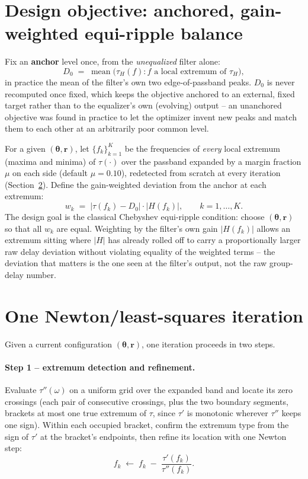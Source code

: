 \documentclass[11pt]{article}
\begin{document}
\section{Design objective: anchored, gain-weighted equi-ripple balance}

Fix an \textbf{anchor} level once, from the \emph{unequalized} filter
alone:
\begin{equation}
D_0 \;=\; \operatorname{mean}\Big(\tau_H(f) : f \text{ a local extremum of } \tau_H\Big),
\label{eq:anchor}
\end{equation}
in practice the mean of the filter's own two edge-of-passband peaks.
$D_0$ is never recomputed once fixed, which keeps the objective anchored
to an external, fixed target rather than to the equalizer's own
(evolving) output -- an unanchored objective was found in practice to
let the optimizer invent new peaks and match them to each other at an
arbitrarily poor common level.

For a given $(\boldsymbol\theta, \mathbf r)$, let $\{f_k\}_{k=1}^K$ be
the frequencies of \emph{every} local extremum (maxima and minima) of
$\tau(\cdot)$ over the passband expanded by a margin fraction $\mu$ on
each side (default $\mu=0.10$), redetected from scratch at every
iteration (Section~\ref{sec:iteration}). Define the gain-weighted
deviation from the anchor at each extremum:
\begin{equation}
w_k \;=\; \big|\tau(f_k) - D_0\big| \cdot |H(f_k)|, \qquad k = 1, \dots, K.
\label{eq:wk}
\end{equation}
The design goal is the classical Chebyshev equi-ripple condition: choose
$(\boldsymbol\theta, \mathbf r)$ so that all $w_k$ are equal. Weighting
by the filter's own gain $|H(f_k)|$ allows an extremum sitting where
$|H|$ has already rolled off to carry a proportionally larger raw delay
deviation without violating equality of the weighted terms -- the
deviation that matters is the one seen at the filter's output, not the
raw group-delay number.

\section{One Newton/least-squares iteration}
\label{sec:iteration}

Given a current configuration $(\boldsymbol\theta, \mathbf r)$, one
iteration proceeds in two steps.

\paragraph{Step 1 -- extremum detection and refinement.} Evaluate
$\tau''(\omega)$ on a uniform grid over the expanded band and locate its
zero crossings (each pair of consecutive crossings, plus the two
boundary segments, brackets at most one true extremum of $\tau$, since
$\tau'$ is monotonic wherever $\tau''$ keeps one sign). Within each
occupied bracket, confirm the extremum type from the sign of $\tau'$ at
the bracket's endpoints, then refine its location with one Newton step:
\begin{equation}
f_k \;\leftarrow\; f_k \;-\; \frac{\tau'(f_k)}{\tau''(f_k)}.
\label{eq:newtonrefine}
\end{equation}
\end{document}
